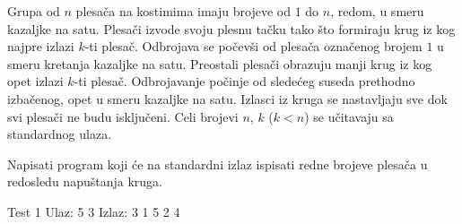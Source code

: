 \begin{Exercise}[label=612]
Grupa od $n$ plesača na kostimima imaju brojeve od $1$ do $n$, redom, u smeru kazaljke na satu.
Plesači izvode svoju plesnu tačku tako što formiraju krug iz kog najpre izlazi $k$-ti plesač.
Odbrojava se počevši od plesača označenog brojem $1$ u smeru kretanja kazaljke na satu. 
Preostali plesači obrazuju manji krug iz kog opet izlazi $k$-ti plesač. Odbrojavanje počinje od
sledećeg suseda prethodno izbačenog, opet u smeru kazaljke na satu. Izlasci iz kruga se nastavljaju
sve dok svi plesači ne budu isključeni. 
Celi brojevi $n$, $k$ ($k < n$) se učitavaju sa standardnog ulaza. 

Napisati program koji će na standardni izlaz ispisati redne brojeve plesača u redosledu napuštanja kruga. 




\begin{minitest}
\begin{test}{Test 1}
Ulaz: 
  5 3 
Izlaz: 
  3 1 5 2 4
\end{test}
\end{minitest}
\end{Exercise}
\begin{Answer}[ref=612]
\end{Answer}

